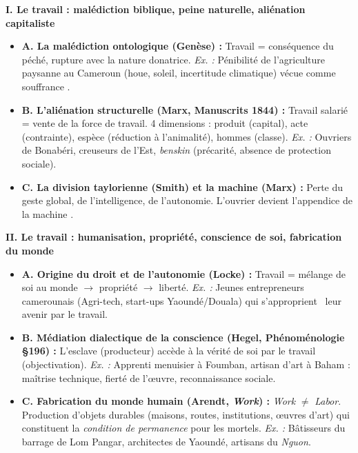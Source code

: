 \documentclass[11pt]{article}
\begin{document}
\begin{corrige}
\textbf{I. Le travail : malédiction biblique, peine naturelle, aliénation capitaliste}
\begin{itemize}
\item \textbf{A. La malédiction ontologique (Genèse) :} Travail = conséquence du péché, rupture avec la nature donatrice. \emph{Ex. :} Pénibilité de l'agriculture paysanne au Cameroun (houe, soleil, incertitude climatique) vécue comme \guillemotleft souffrance \guillemotright.
\item \textbf{B. L'aliénation structurelle (Marx, Manuscrits 1844) :} Travail salarié = vente de la force de travail. 4 dimensions : produit (capital), acte (contrainte), espèce (réduction à l'animalité), hommes (classe). \emph{Ex. :} Ouvriers de Bonabéri, creuseurs de l'Est, \emph{benskin} (précarité, absence de protection sociale).
\item \textbf{C. La division taylorienne (Smith) et la machine (Marx) :} Perte du geste global, de l'intelligence, de l'autonomie. \guillemotleft L'ouvrier devient l'appendice de la machine \guillemotright.
\end{itemize}

\textbf{II. Le travail : humanisation, propriété, conscience de soi, fabrication du monde}
\begin{itemize}
\item \textbf{A. Origine du droit et de l'autonomie (Locke) :} Travail = mélange de soi au monde $\rightarrow$ propriété $\rightarrow$ liberté. \emph{Ex. :} Jeunes entrepreneurs camerounais (Agri-tech, start-ups Yaoundé/Douala) qui \guillemotleft s'approprient \guillemotright\ leur avenir par le travail.
\item \textbf{B. Médiation dialectique de la conscience (Hegel, Phénoménologie §196) :} L'esclave (producteur) accède à la vérité de soi par le travail (objectivation). \emph{Ex. :} Apprenti menuisier à Foumban, artisan d'art à Baham : maîtrise technique, fierté de l'œuvre, reconnaissance sociale.
\item \textbf{C. Fabrication du monde humain (Arendt, \emph{Work}) :} \emph{Work} $\neq$ \emph{Labor}. Production d'objets durables (maisons, routes, institutions, œuvres d'art) qui constituent la \emph{condition de permanence} pour les mortels. \emph{Ex. :} Bâtisseurs du barrage de Lom Pangar, architectes de Yaoundé, artisans du \emph{Nguon}.
\end{itemize}


\end{corrige}
\end{document}

